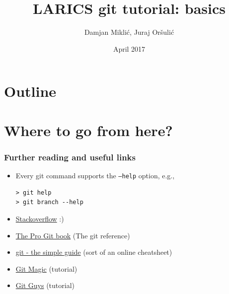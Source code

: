 \documentclass[xcolor=dvipsnames]{beamer}%
\title[git basics]
{LARICS git tutorial: basics}
\author[Mikli\'{c}, Or\v{s}uli\'{c}]{Damjan Mikli\'{c}, Juraj Or\v{s}uli\'{c}}
\institute[LARICS]{LARICS Lab\\FER, University of Zagreb}
\date[]{April 2017}
\begin{document}

\begin{frame}
	\titlepage
\end{frame}

\section*{Outline}
\begin {frame}
	\tableofcontents
\end{frame}












\section{Where to go from here?}

\begin{frame}[fragile]

\frametitle{Further reading and useful links}
	
\begin{itemize}
	\item Every git command supports the \texttt{--help} option, e.g.,
	\begin{verbatim}
> git help
> git branch --help
	\end{verbatim}
	\item \href{http://stackoverflow.com/questions/tagged/git}{Stackoverflow} :)
	\item \href{https://git-scm.com/book/en/v2}{The Pro Git book} (The git reference)
	\item \href{http://rogerdudler.github.io/git-guide/}{git - the simple guide} (sort of an online cheatsheet)
	\item \href{http://www-cs-students.stanford.edu/~blynn/gitmagic/}{Git Magic} (tutorial) 
	\item \href{http://www.gitguys.com/}{Git Guys} (tutorial)
	\end{itemize}
	
\end{frame}
\end{document}
